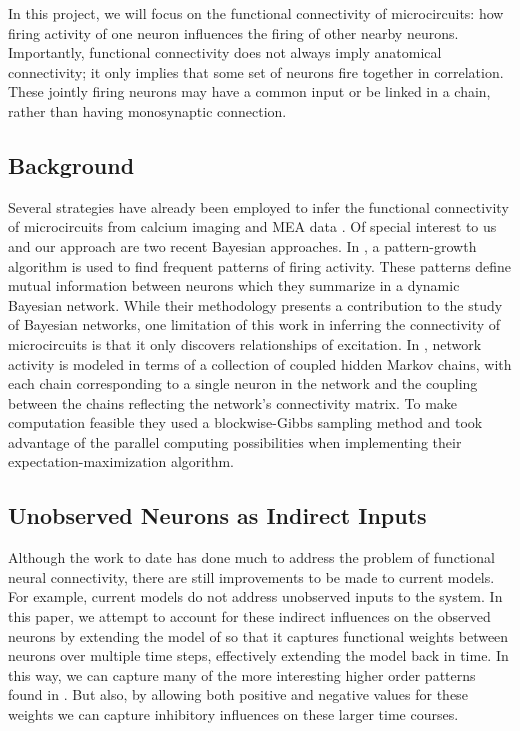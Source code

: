 \documentclass{article}
\begin{document}

In this project, we will focus on the functional connectivity of
microcircuits: how firing activity of one neuron influences the firing of other nearby neurons.
Importantly, functional connectivity does not always imply anatomical connectivity; it only implies that
some set of neurons fire together in correlation.  These jointly firing neurons may have a common input
or be linked in a chain, rather than having monosynaptic connection.

\subsection{Background}

Several strategies have already been employed to infer the functional
connectivity of microcircuits from calcium imaging and MEA data
\citep{Gerwinn2010, takahashi2007, aguiar2009}. Of special interest to us and our approach
are two recent Bayesian approaches. In \citep{patnaik2011}, 
a pattern-growth algorithm is used to find frequent patterns of firing 
activity. These patterns define mutual information between neurons
which they summarize in a dynamic Bayesian network. While their
methodology presents a contribution to the study of Bayesian networks,
one limitation of this work in inferring the connectivity of
microcircuits is that it only discovers relationships of excitation. In \citep{mishchencko2011}, network activity is modeled in terms of a collection of coupled hidden Markov chains, with each chain
corresponding to a single neuron in the network and the coupling
between the chains reflecting the network’s connectivity matrix.
To make computation feasible they used a blockwise-Gibbs sampling
method and took advantage of the parallel computing possibilities
when implementing their expectation-maximization algorithm. 

\subsection{Unobserved Neurons as Indirect Inputs}

Although the work to date has done much to address the problem of
functional neural connectivity, there are still improvements to be
made to current models. For example, current models do not address
unobserved inputs to the system. In this paper, we attempt to account for these indirect influences on the observed neurons by extending the model of \citep{mishchencko2011} so that it captures functional weights between neurons over multiple time steps, effectively extending the model back in time. In this way, we can capture many of the more interesting higher order patterns found in \citep{patnaik2011}.  But also, by allowing both positive and negative values for these weights we can capture inhibitory influences on these larger time courses.
\end{document}
